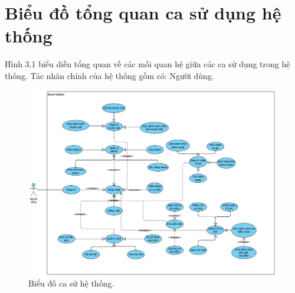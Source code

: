 \section{Biểu đồ tổng quan ca sử dụng hệ thống}
Hình 3.1 biểu diễn tổng quan về các mối quan hệ giữa các ca sử dụng trong hệ
thống. Tác nhân chính của hệ thống gồm có: Người dùng.
\begin{figure}[H]
    \centering
    \includegraphics[width=1.1\textwidth]{figures/c3/3-2-usecase-graph.png}
    \caption{Biểu đồ ca sử hệ thống.}
    \label{fig:3-2-usecase-graph}
\end{figure}
